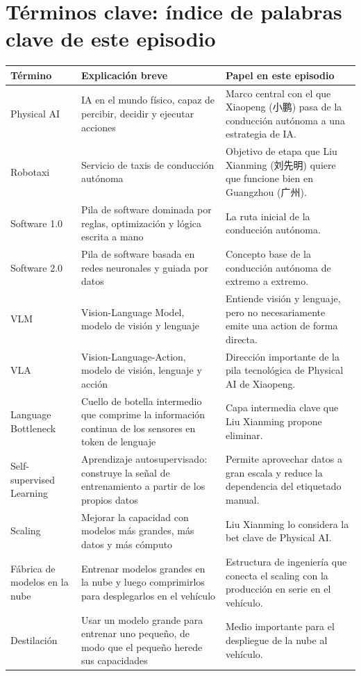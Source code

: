 \section{Términos clave: índice de palabras clave de este episodio}

\begin{longtable}{p{}p{}p{}}
\toprule
Término & Explicación breve & Papel en este episodio \\
\midrule
Physical AI & IA en el mundo físico, capaz de percibir, decidir y ejecutar acciones & Marco central con el que Xiaopeng (小鹏) pasa de la conducción autónoma a una estrategia de IA. \\
Robotaxi & Servicio de taxis de conducción autónoma & Objetivo de etapa que Liu Xianming (刘先明) quiere que funcione bien en Guangzhou (广州). \\
Software 1.0 & Pila de software dominada por reglas, optimización y lógica escrita a mano & La ruta inicial de la conducción autónoma. \\
Software 2.0 & Pila de software basada en redes neuronales y guiada por datos & Concepto base de la conducción autónoma de extremo a extremo. \\
VLM & Vision-Language Model, modelo de visión y lenguaje & Entiende visión y lenguaje, pero no necesariamente emite una action de forma directa. \\
VLA & Vision-Language-Action, modelo de visión, lenguaje y acción & Dirección importante de la pila tecnológica de Physical AI de Xiaopeng. \\
Language Bottleneck & Cuello de botella intermedio que comprime la información continua de los sensores en token de lenguaje & Capa intermedia clave que Liu Xianming propone eliminar. \\
Self-supervised Learning & Aprendizaje autosupervisado: construye la señal de entrenamiento a partir de los propios datos & Permite aprovechar datos a gran escala y reduce la dependencia del etiquetado manual. \\
Scaling & Mejorar la capacidad con modelos más grandes, más datos y más cómputo & Liu Xianming lo considera la bet clave de Physical AI. \\
Fábrica de modelos en la nube & Entrenar modelos grandes en la nube y luego comprimirlos para desplegarlos en el vehículo & Estructura de ingeniería que conecta el scaling con la producción en serie en el vehículo. \\
Destilación & Usar un modelo grande para entrenar uno pequeño, de modo que el pequeño herede sus capacidades & Medio importante para el despliegue de la nube al vehículo. \\

\end{longtable}
